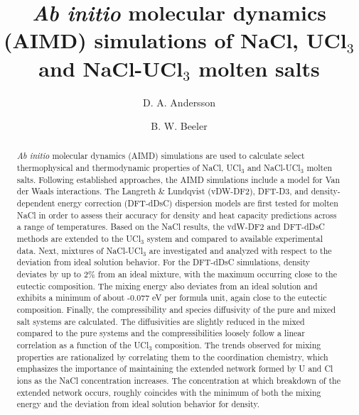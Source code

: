 \documentclass[preprint,3p,10pt,onecolumn,number,sort&compress]{elsarticle}
\begin{document}
\begin{frontmatter}

\title{\textit{Ab initio} molecular dynamics (AIMD) simulations of NaCl, UCl$_3$ and NaCl-UCl$_3$ molten salts}

\author[label1]{D. A. Andersson}
\author[label2,label3]{B. W. Beeler}
\address[label1]{Materials Science and Technology Division, Los Alamos National Laboratory P.O. Box 1663, Los Alamos, NM 87545, USA}
\address[label2]{Department of Nuclear Engineering, North Carolina State University, Raleigh, NC, United States}
\address[label3]{Idaho National Laboratory, Idaho Falls, ID 83415, United States}


\begin{abstract}
\textit{Ab initio} molecular dynamics (AIMD) simulations are used to calculate select thermophysical  
and thermodynamic 
properties of NaCl, UCl$_3$ and NaCl-UCl$_3$ molten salts. Following established approaches, the AIMD simulations  
include a model for Van der Waals interactions. The Langreth \& Lundqvist (vDW-DF2), DFT-D3, and density-dependent energy correction (DFT-dDsC) dispersion models are first tested for molten NaCl in order {\color{red}to} assess their accuracy for density and heat capacity predictions across a range of temperatures. 
Based on the NaCl results, the vdW-DF2 and DFT-dDsC methods are extended to the UCl$_3$ system and compared to available experimental data. 
Next, mixtures of NaCl-UCl$_3$ are investigated and analyzed with respect to the deviation from ideal solution behavior.  
For the DFT-dDsC simulations, density deviates by up to 2\% from an ideal mixture, with the maximum occurring close to the eutectic composition. 
The mixing energy also deviates from an ideal solution and exhibits a minimum of about -0.077 eV per formula unit, again close to the eutectic composition. Finally, the compressibility and species diffusivity of the pure and mixed salt systems are calculated. The diffusivities are slightly reduced in the mixed compared to the pure systems and the compressibilities loosely follow a linear correlation as a function of the UCl$_3$ composition.  
The trends observed for mixing properties are rationalized by correlating them to the coordination chemistry, which emphasizes the importance of maintaining the extended network formed by U and Cl ions as the NaCl concentration increases. The concentration at which breakdown of the extended network occurs, roughly coincides with the minimum of both the mixing energy and the deviation from ideal solution behavior for density.
\end{abstract}




\end{frontmatter}
\end{document}
